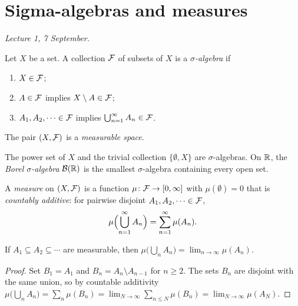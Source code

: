 \section{Sigma-algebras and measures}

\emph{Lecture 1, 7 September.}

\begin{definition}
Let $X$ be a set. A collection $\mathcal{F}$ of subsets of $X$ is a \emph{$\sigma$-algebra} if
\begin{enumerate}[label=(\roman*)]
  \item $X \in \mathcal{F}$;
  \item $A \in \mathcal{F}$ implies $X \setminus A \in \mathcal{F}$;
  \item $A_1, A_2, \dots \in \mathcal{F}$ implies $\bigcup_{n=1}^\infty A_n \in \mathcal{F}$.
\end{enumerate}
The pair $(X, \mathcal{F})$ is a \emph{measurable space}.
\end{definition}

\begin{example}
The power set of $X$ and the trivial collection $\{\emptyset, X\}$ are $\sigma$-algebras. On $\mathbb{R}$, the \emph{Borel $\sigma$-algebra} $\mathcal{B}(\mathbb{R})$ is the smallest $\sigma$-algebra containing every open set.
\end{example}

\begin{definition}
A \emph{measure} on $(X, \mathcal{F})$ is a function $\mu \colon \mathcal{F} \to [0, \infty]$ with $\mu(\emptyset) = 0$ that is \emph{countably additive}: for pairwise disjoint $A_1, A_2, \dots \in \mathcal{F}$,
\[
  \mu\Bigl( \bigcup_{n=1}^\infty A_n \Bigr) = \sum_{n=1}^\infty \mu(A_n).
\]
\end{definition}

\begin{lemma}
If $A_1 \subseteq A_2 \subseteq \cdots$ are measurable, then $\mu\bigl( \bigcup_n A_n \bigr) = \lim_{n \to \infty} \mu(A_n)$.
\end{lemma}

\begin{proof}
Set $B_1 = A_1$ and $B_n = A_n \setminus A_{n-1}$ for $n \ge 2$. The sets $B_n$ are disjoint with the same union, so by countable additivity $\mu\bigl( \bigcup_n A_n \bigr) = \sum_n \mu(B_n) = \lim_{N \to \infty} \sum_{n \le N} \mu(B_n) = \lim_{N \to \infty} \mu(A_N)$.
\end{proof}

